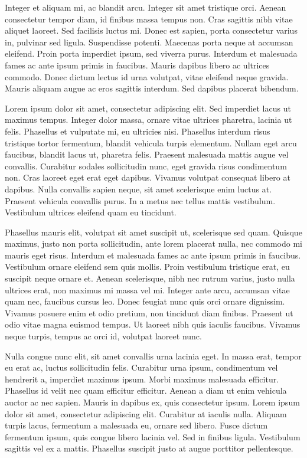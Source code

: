 \documentclass[
  12pt,
  a4paper,
]{book}
\begin{document}
Integer et aliquam mi, ac blandit arcu. Integer sit amet tristique orci. Aenean consectetur tempor diam, id finibus massa tempus non. Cras sagittis nibh vitae aliquet laoreet. Sed facilisis luctus mi. Donec est sapien, porta consectetur varius in, pulvinar sed ligula. Suspendisse potenti. Maecenas porta neque at accumsan eleifend. Proin porta imperdiet ipsum, sed viverra purus. Interdum et malesuada fames ac ante ipsum primis in faucibus. Mauris dapibus libero ac ultrices commodo. Donec dictum lectus id urna volutpat, vitae eleifend neque gravida. Mauris aliquam augue ac eros sagittis interdum. Sed dapibus placerat bibendum.

Lorem ipsum dolor sit amet, consectetur adipiscing elit. Sed imperdiet lacus ut maximus tempus. Integer dolor massa, ornare vitae ultrices pharetra, lacinia ut felis. Phasellus et vulputate mi, eu ultricies nisi. Phasellus interdum risus tristique tortor fermentum, blandit vehicula turpis elementum. Nullam eget arcu faucibus, blandit lacus ut, pharetra felis. Praesent malesuada mattis augue vel convallis. Curabitur sodales sollicitudin nunc, eget gravida risus condimentum non. Cras laoreet eget erat eget dapibus. Vivamus volutpat consequat libero at dapibus. Nulla convallis sapien neque, sit amet scelerisque enim luctus at. Praesent vehicula convallis purus. In a metus nec tellus mattis vestibulum. Vestibulum ultrices eleifend quam eu tincidunt.

Phasellus mauris elit, volutpat sit amet suscipit ut, scelerisque sed quam. Quisque maximus, justo non porta sollicitudin, ante lorem placerat nulla, nec commodo mi mauris eget risus. Interdum et malesuada fames ac ante ipsum primis in faucibus. Vestibulum ornare eleifend sem quis mollis. Proin vestibulum tristique erat, eu suscipit neque ornare et. Aenean scelerisque, nibh nec rutrum varius, justo nulla ultrices erat, non maximus mi massa vel mi. Integer ante arcu, accumsan vitae quam nec, faucibus cursus leo. Donec feugiat nunc quis orci ornare dignissim. Vivamus posuere enim et odio pretium, non tincidunt diam finibus. Praesent ut odio vitae magna euismod tempus. Ut laoreet nibh quis iaculis faucibus. Vivamus neque turpis, tempus ac orci id, volutpat laoreet nunc.

Nulla congue nunc elit, sit amet convallis urna lacinia eget. In massa erat, tempor eu erat ac, luctus sollicitudin felis. Curabitur urna ipsum, condimentum vel hendrerit a, imperdiet maximus ipsum. Morbi maximus malesuada efficitur. Phasellus id velit nec quam efficitur efficitur. Aenean a diam ut enim vehicula auctor ac nec sapien. Mauris in dapibus ex, quis consectetur ipsum. Lorem ipsum dolor sit amet, consectetur adipiscing elit. Curabitur at iaculis nulla. Aliquam turpis lacus, fermentum a malesuada eu, ornare sed libero. Fusce dictum fermentum ipsum, quis congue libero lacinia vel. Sed in finibus ligula. Vestibulum sagittis vel ex a mattis. Phasellus suscipit justo at augue porttitor pellentesque.
\end{document}
